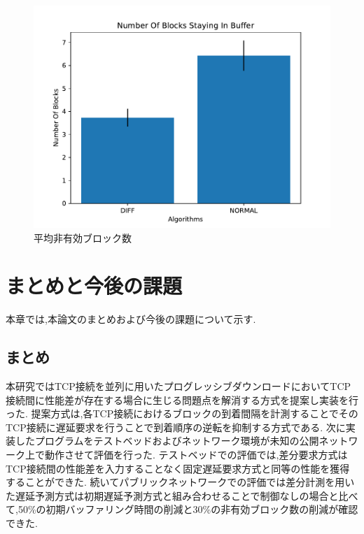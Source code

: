 \documentclass[a4j,12pt]{gradthesis_utf8}
\begin{document}
\begin{figure}[ht]
	\begin{center}
		\includegraphics[width=12.125cm]{figure/NumberOfBlocksStayingInBufferPub.pdf}
		\caption{平均非有効ブロック数}
		\label{nsbpub}
	\end{center}
\end{figure}
 
\chapter{まとめと今後の課題}\label{matomekongo}
本章では,本論文のまとめおよび今後の課題について示す.
\section{まとめ}
本研究ではTCP接続を並列に用いたプログレッシブダウンロードにおいてTCP接続間に性能差が存在する場合に生じる問題点を解消する方式を提案し実装を行った.
提案方式は,各TCP接続におけるブロックの到着間隔を計測することでそのTCP接続に遅延要求を行うことで到着順序の逆転を抑制する方式である.
次に実装したプログラムをテストベッドおよびネットワーク環境が未知の公開ネットワーク上で動作させて評価を行った.
テストベッドでの評価では,差分要求方式はTCP接続間の性能差を入力することなく固定遅延要求方式と同等の性能を獲得することができた.
続いてパブリックネットワークでの評価では差分計測を用いた遅延予測方式は初期遅延予測方式と組み合わせることで制御なしの場合と比べて,50\%の初期バッファリング時間の削減と30\%の非有効ブロック数の削減が確認できた.
\end{document}

